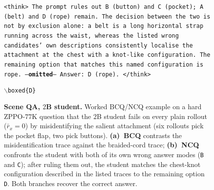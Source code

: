 \documentclass{llmxive}
\begin{document}
\begin{figure}[!p]
\begin{prompttemplatefig}
\smallskip
\texttt{<think> The prompt rules out B (button) and C (pocket); A (belt) and D (rope) remain. The decision between the two is not by exclusion alone: a belt is a long horizontal strap running across the waist, whereas the listed wrong candidates' own descriptions consistently localise the attachment at the chest with a knot-like configuration. The remaining option that matches this named configuration is rope. ---\textbf{omitted}--- Answer: D (rope). </think>}

\smallskip
\texttt{$\backslash$boxed\{D\}} \quad \checkmark
\end{prompttemplatefig}

\caption{\textbf{Scene QA, $2$B student.} Worked BCQ/NCQ example on a hard ZPPO-$77$K question that the $2$B student fails on every plain rollout ($\bar{r}_x\!=\!0$) by misidentifying the salient attachment (six rollouts pick the pocket flap, two pick buttons). \textbf{(a)~BCQ} contrasts the misidentification trace against the braided-cord trace; \textbf{(b)~NCQ} confronts the student with both of its own wrong answer modes (\texttt{B} and \texttt{C}); after ruling them out, the student matches the chest-knot configuration described in the listed traces to the remaining option \texttt{D}. Both branches recover the correct answer.}
\label{fig:appendix:bcq_ncq_coat}
\end{figure}
\end{document}
